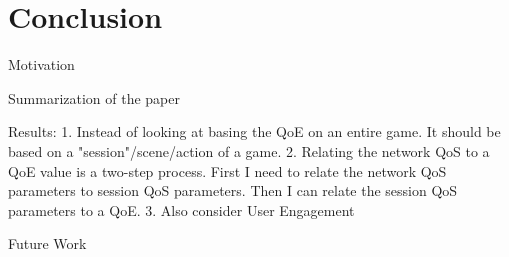 
\section{Conclusion}

Motivation

Summarization of the paper

Results:
1. Instead of looking at basing the QoE on an entire game. It should be based on a "session"/scene/action of a game.
2. Relating the network QoS to a QoE value is a two-step process. First I need to relate the network QoS parameters to session QoS parameters. Then I can relate the session QoS parameters to a QoE.
3. Also consider User Engagement

Future Work
